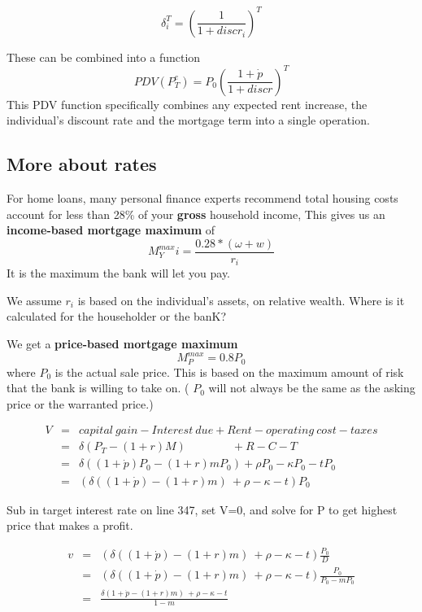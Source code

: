 \[\delta_i^T= \left( \frac{1}{1+discr_i} \right)^T \]
 
These can be combined into a function %
\[ PDV(P^e_T)=P_0\left( \frac{1+\dot p}{1+discr} \right)^T \]
This PDV function specifically combines any expected rent increase, the individual's discount rate and the mortgage term into a single operation. 




\subsection{More about rates}

For home loans, many personal finance experts recommend total housing costs account for less than 28\% of your \textbf{gross} household income, This gives us an \textbf{income-based  mortgage maximum} of \[M^{max}_Yi = \frac{0.28*(\omega+w)}{r_i}\] It is the maximum the bank will let you pay.

We assume $r_i$ is based on the individual's assets, on relative wealth. Where is it calculated for the householder or the banK?

We get a \textbf{price-based mortgage maximum} \[M^{max}_P = 0.8P_0\] where $P_0$ is the actual sale price. This is based on the maximum amount of risk that the bank is willing to take on. ( $P_0$  will not always be the same as the asking price or the warranted price.) 


\begin{eqnarray}
V  	&=& capital\ gain - Interest\ due  	+ Rent  - operating\ cost -taxes\\
&=& \delta(P_T- (1+r)M) \qquad \qquad 	 + R  	-C   - T\label{B2}\\
&=& \delta((1+\dot p)  P_0- (1+r)mP_0)   + \rho P_0  	-\kappa P_0 - tP_0\\
&=&( \delta((1+\dot p)  - (1+r)m) \ + \rho   	-\kappa -t) P_0
\end{eqnarray}

Sub in target interest rate on line 347,  set V=0, and solve for P to get highest price that makes a profit.

\begin{eqnarray}
v&=&( \delta((1+\dot p)  - (1+r)m) \ + \rho   	-\kappa - t ) \frac{P_0}{D}   \nonumber\\
		&=&( \delta((1+\dot p)  - (1+r)m) \ + \rho   	-\kappa - t ) \frac{P_0}{P_0-mP_0}   \nonumber\\
		&=&\frac{ \delta(1+\dot p  - (1+r)m) \ + \rho   	-\kappa - t } {1-m} \label{Eqn:DecisionRule}
\end{eqnarray}

